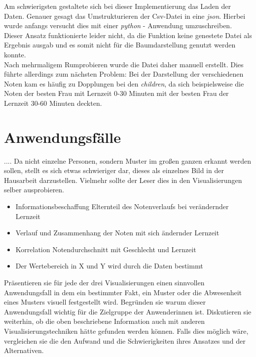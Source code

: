 \documentclass[usegeometry=true]{scrartcl}
\begin{document}
\noindent Am schwierigsten gestaltete sich bei dieser Implementierung das Laden der Daten. Genauer gesagt das Umstrukturieren der Csv-Datei in eine \textit{json}. Hierbei wurde anfangs versucht dies mit einer \textit{python} - Anwendung umzuschreiben. Dieser Ansatz funktionierte leider nicht, da die Funktion keine genestete Datei als Ergebnis ausgab und es somit nicht für die Baumdarstellung genutzt werden konnte. \\
Nach mehrmaligem Rumprobieren wurde die Datei daher manuell erstellt. Dies führte allerdings zum nächsten Problem: Bei der Darstellung der verschiedenen Noten kam es häufig zu Dopplungen bei den \textit{children}, da sich beispielsweise die Noten der besten Frau mit Lernzeit 0-30 Minuten mit der besten Frau der Lernzeit 30-60 Minuten deckten. %



\section{Anwendungsfälle}

.... Da nicht einzelne Personen, sondern Muster im großen ganzen erkannt werden sollen, stellt es sich etwas schwieriger dar, dieses als einzelnes Bild in der Hausarbeit darzustellen. Vielmehr sollte der Leser dies in den Visualisierungen selber ausprobieren.

\begin{itemize}
\item Informationsbeschaffung Elternteil des Notenverlaufs bei verändernder Lernzeit
\item Verlauf und Zusammenhang der Noten mit sich ändernder Lernzeit
\item Korrelation Notendurchschnitt mit Geschlecht und Lernzeit
\item Der Wertebereich in X und Y wird durch die Daten bestimmt
\end{itemize}

Präsentieren sie für jede der drei Visualisierungen einen sinnvollen Anwendungsfall in dem ein bestimmter Fakt, ein Muster oder die Abwesenheit eines Musters visuell festgestellt wird. Begründen sie warum dieser Anwendungsfall wichtig für die Zielgruppe der Anwenderinnen ist. Diskutieren sie weiterhin, ob die oben beschriebene Information auch mit anderen Visualisierungstechniken hätte gefunden werden können. Falls dies möglich wäre, vergleichen sie die den Aufwand und die Schwierigkeiten ihres Ansatzes und der Alternativen. 
\end{document}
